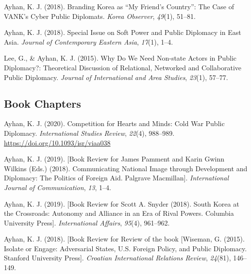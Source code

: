 \documentclass[11pt,a4paper,]{awesome-cv}
\begin{document}
\leavevmode{}%
Ayhan, K. J. (2018). Branding {Korea} as {``{My} {Friend}'s
{Country}''}: {The} {Case} of {VANK}'s {Cyber} {Public} {Diplomats}.
\emph{Korea Observer}, \emph{49}(1), 51--81.

\leavevmode{}%
Ayhan, K. J. (2018). Special {Issue} on {Soft} {Power} and {Public}
{Diplomacy} in {East} {Asia}. \emph{Journal of Contemporary Eastern
Asia}, \emph{17}(1), 1--4.

\leavevmode{}%
Lee, G., \& Ayhan, K. J. (2015). Why {Do} {We} {Need} {Non}-state
{Actors} in {Public} {Diplomacy}?: {Theoretical} {Discussion} of
{Relational}, {Networked} and {Collaborative} {Public} {Diplomacy}.
\emph{Journal of International and Area Studies}, \emph{23}(1), 57--77.

\hypertarget{book-chapters}{%
\subsection{Book Chapters}\label{book-chapters}}

\hypertarget{refs_section}{}
\leavevmode{}%
Ayhan, K. J. (2020). Competition for {Hearts} and {Minds}: {Cold} {War}
{Public} {Diplomacy}. \emph{International Studies Review}, \emph{22}(4),
988--989. \url{https://doi.org/10.1093/isr/viaa038}

\leavevmode{}%
Ayhan, K. J. (2019). {[}{Book} {Review} for {James} {Pamment} and
{Karin} {Gwinn} {Wilkins} ({Eds}.) (2018). {Communicating} {National}
{Image} through {Development} and {Diplomacy}: {The} {Politics} of
{Foreign} {Aid}. {Palgrave} {Macmillan}{]}. \emph{International Journal
of Communication}, \emph{13}, 1--4.

\leavevmode{}%
Ayhan, K. J. (2019). {[}{Book} {Review} for {Scott} {A}. {Snyder}
(2018). {South} {Korea} at the {Crossroads}: {Autonomy} and {Alliance}
in an {Era} of {Rival} {Powers}. {Columbia} {University} {Press}{]}.
\emph{International Affairs}, \emph{95}(4), 961--962.

\leavevmode{}%
Ayhan, K. J. (2018). {[}{Book} {Review} for {Review} of the book
{[}{Wiseman}, {G}. (2015). {Isolate} or {Engage}: {Adversarial}
{States}, {U}.{S}. {Foreign} {Policy}, and {Public} {Diplomacy}.
{Stanford} {University} {Press}{]}. \emph{Croatian International
Relations Review}, \emph{24}(81), 146--149.
\end{document}
